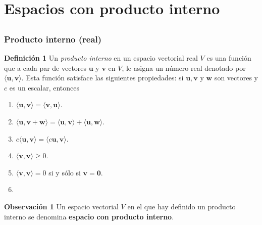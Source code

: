 \section{Espacios con producto interno}

\subsection{}

\begin{frame}\frametitle{Producto interno (real)}

\begin{block}{\textbf{Definición 1 }}	
	\justifying
	Un \textit{producto interno} en un espacio vectorial real $V$ es una función que a cada par de vectores 
	$\mathbf{u}$ y $\mathbf{v}$ en $V$, le asigna un número real denotado por $\langle \mathbf{u}, \mathbf{v}\rangle$.
	Esta función satisface las siguientes propiedades: si $\mathbf{u}, \mathbf{v}$ y $\mathbf{w}$ son vectores y 
	$c$ es un escalar, entonces
	
	\vspace{-3mm}
	\begin{multicols}{2}		
		\begin{enumerate}			
			\justifying
			\item[\labelname{$a$}] $\langle \mathbf{u}, \mathbf{v}\rangle = \langle \mathbf{v}, \mathbf{u}\rangle$. \\%
			\item[\labelname{$b$}] $\langle \mathbf{u}, \mathbf{v}+\mathbf{w}\rangle 
			      = \langle \mathbf{u}, \mathbf{v}\rangle + \langle \mathbf{u}, \mathbf{w}\rangle$. \\%
			\item[\labelname{$c$}] $c\langle \mathbf{u}, \mathbf{v}\rangle = \langle c\mathbf{u}, \mathbf{v}\rangle$.\\
			\columnbreak
			\item[\labelname{$d$}] $\langle \mathbf{v}, \mathbf{v}\rangle \geq 0 $. 
			\item[\labelname{$e$}] $\langle \mathbf{v}, \mathbf{v}\rangle = 0 $ si y sólo si $\mathbf{v}=\mathbf{0}$. 
			\item[]
		\end{enumerate}		
	\end{multicols}
	
\end{block}

\begin{alertblock}{\textbf{Observación 1}}\justifying
	Un espacio vectorial $V$ en el que hay definido un producto interno se denomina \textbf{espacio con producto interno}.
\end{alertblock}

\end{frame}

